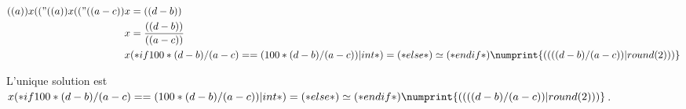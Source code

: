 \exercice*

\begin{align*}
  (( a )) x (( "%
  (( a )) x (( "%
  (( a - c )) x &= (( d - b )) \\
  x &= \frac{(( d - b ))}{(( a - c ))} \\
  x &
        (* if 100*(d-b)/(a-c) == (100*(d-b)/(a-c))|int *)
            =
        (* else *)
            \simeq
        (* endif *)
        \numprint{(( ((d-b)/(a-c)) | round(2) ))}
\end{align*}

L'unique solution est
$x
(* if 100*(d-b)/(a-c) == (100*(d-b)/(a-c))|int *)
    =
(* else *)
    \simeq
(* endif *)
\numprint{(( ((d-b)/(a-c)) | round(2) ))}$.
